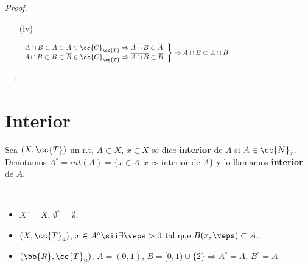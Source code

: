 \begin{prop}
\begin{proof}
\begin{enumerate}
\begin{itemize}
            \end{itemize}
            \item[(iv)]\ \\
            \vspace{-2cm}

            \begin{gather*}
                \left.
                \begin{array}{c}
                    A\cap B \subset A \subset \overline{A}\in \cc{C}_{\cc{T}}\Rightarrow \overline{A\cap B}\subset \overline{A} \\
                    A\cap B \subset B \subset \overline{B}\in \cc{C}_{\cc{T}}\Rightarrow \overline{A\cap B}\subset \overline{B}
                \end{array}\right\} \Rightarrow \overline{A\cap B}\subset \overline{A}\cap \overline{B} \hspace*{5cm}
            \end{gather*}
        \end{enumerate}
    \end{proof}
\end{prop}

\section{Interior}

\begin{definicion}
    Sea $(X, \cc{T})$ un r.t, $A\subset X$, $x\in X$ se dice \textbf{interior} de $A$ si $A\in \cc{N}_x$. Denotamos $A^\circ=int(A)=\{x\in A : x \text{ es interior de }A\}$ y lo llamamos \textbf{interior} de $A$.
    \endsquare 
\end{definicion}

\begin{ejemplo}\
    \begin{itemize}
        \item $X^\circ = X$, $\emptyset^\circ = \emptyset$.
        \item $(X, \cc{T}_d)$, $x \in A^\circ \sii \exists \veps >0 $ tal que $B(x, \veps)\subset A$.
        \item $(\bb{R}, \cc{T}_u)$, $A=(0,1)$, $B=[0,1)\cup \{2\} \Rightarrow A^\circ=A$, $B^\circ=A$
    \end{itemize}
\end{ejemplo}

